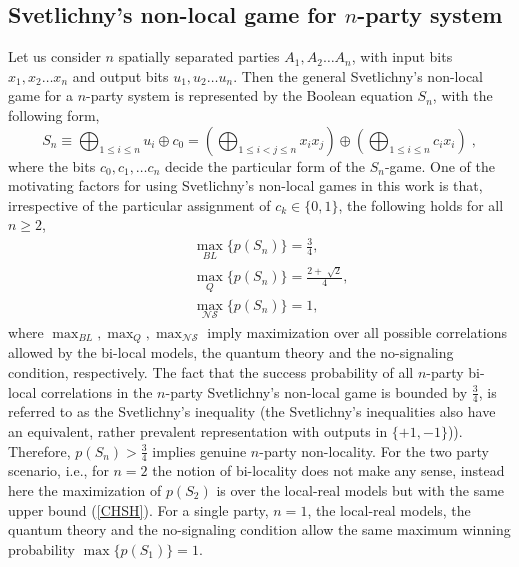 \documentclass[%
 reprint,
 amsmath,amssymb,
 aps,
]{revtex4-1}
\theoremstyle{plain}
\begin{document}
\subsection{Svetlichny's non-local game for $n$-party system} 
Let us consider $n$ spatially separated parties $A_1,A_2 \ldots A_n$, with input bits $x_1,x_2 \ldots x_n$ and output bits $u_1,u_2 \ldots u_n$. Then the general Svetlichny's non-local game for a $n$-party system is represented by the Boolean equation $S_n$, with the following form, 
\begin{equation}
\label{svetlichny_recurssive}
S_n \equiv  \bigoplus_{1\le i \le n} u_i \oplus c_0 = (\bigoplus_{1\le i<j \le n} x_i x_j) \oplus (\bigoplus_{1 \le i \le n}c_i x_i) \; ,
\end{equation}
where the bits $c_0,c_1,\ldots c_n$ decide the particular form of the $S_n$-game. One of the motivating factors for using Svetlichny's non-local games in this work is that, irrespective of the particular assignment of $c_k\in\{0,1\}$, the following holds for all $n\geq2$,
\begin{eqnarray}
&&\max_{BL}\{p(S_n)\}=\frac{3}{4},\nonumber \\
&&\max_{Q}\{p(S_n)\}=\frac{2+\sqrt[]{2}}{4},\nonumber \\
&&\max_{\mathcal{NS}}\{p(S_n)\}=1,
\end{eqnarray}
where $\max_{BL},\max_{Q},\max_{\mathcal{NS}}$ imply maximization over all possible correlations allowed by the bi-local models, the quantum theory and the no-signaling condition, respectively. The fact that the success probability of all $n$-party bi-local correlations in the $n$-party Svetlichny's non-local game is bounded by $\frac{3}{4}$, is referred to as the Svetlichny's inequality (the Svetlichny's inequalities also have an equivalent, rather prevalent representation with outputs in $\{+1,-1\}$)). Therefore, $p(S_n)>\frac{3}{4}$ implies genuine $n$-party non-locality.
For the two party scenario, i.e., for $n=2$ the notion of bi-locality does not make any sense, instead here the maximization of $p(S_2)$ is over the local-real models but with the same upper bound (\ref{CHSH}). For a single party, $n=1$, the local-real models, the quantum theory and the no-signaling condition allow the same maximum winning probability $\max\{p(S_1)\}=1$. 
\end{document}
